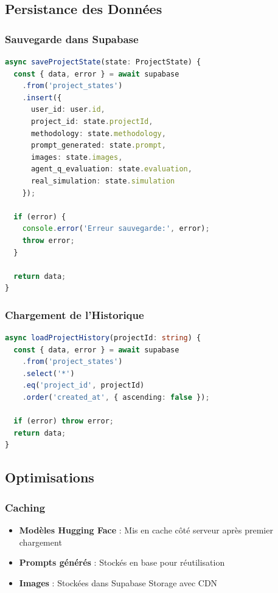 \subsection{Persistance des Données}

\subsubsection{Sauvegarde dans Supabase}

\begin{lstlisting}[language=TypeScript, caption=Sauvegarde de l'état du projet]
async saveProjectState(state: ProjectState) {
  const { data, error } = await supabase
    .from('project_states')
    .insert({
      user_id: user.id,
      project_id: state.projectId,
      methodology: state.methodology,
      prompt_generated: state.prompt,
      images: state.images,
      agent_q_evaluation: state.evaluation,
      real_simulation: state.simulation
    });
    
  if (error) {
    console.error('Erreur sauvegarde:', error);
    throw error;
  }
  
  return data;
}
\end{lstlisting}

\subsubsection{Chargement de l'Historique}

\begin{lstlisting}[language=TypeScript, caption=Chargement de l'historique]
async loadProjectHistory(projectId: string) {
  const { data, error } = await supabase
    .from('project_states')
    .select('*')
    .eq('project_id', projectId)
    .order('created_at', { ascending: false });
    
  if (error) throw error;
  return data;
}
\end{lstlisting}

\subsection{Optimisations}

\subsubsection{Caching}

\begin{itemize}[leftmargin=*]
    \item \textbf{Modèles Hugging Face} : Mis en cache côté serveur après premier chargement
    \item \textbf{Prompts générés} : Stockés en base pour réutilisation
    \item \textbf{Images} : Stockées dans Supabase Storage avec CDN
\end{itemize}

